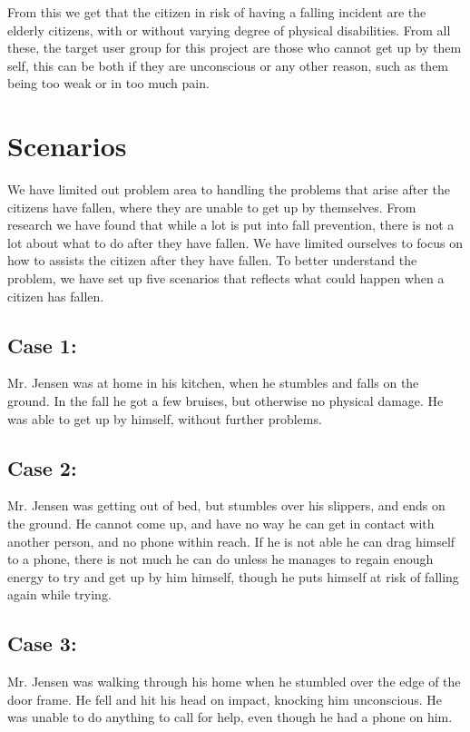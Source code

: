 From this we get that the citizen in risk of having a falling incident are the elderly citizens, with or without varying degree of physical disabilities. From all these, the target user group for this project are those who cannot get up by them self, this can be both if they are unconscious or any other reason, such as them being too weak or in too much pain.

\section{Scenarios} \label{preliminaries:problemanalysis:limitproblem}

We have limited out problem area to handling the problems that arise after the citizens have fallen, where they are unable to get up by themselves. From research we have found that while a lot is put into fall prevention, there is not a lot about what to do after they have fallen. We have limited ourselves to focus on how to assists the citizen after they have fallen. To better understand the problem, we have set up five scenarios that reflects what could happen when a citizen has fallen.

\subsection{Case 1:}
Mr. Jensen was at home in his kitchen, when he stumbles and falls on the ground. In the fall he got a few bruises, but otherwise no physical damage. He was able to get up by himself, without further problems.

\subsection{Case 2:}
Mr. Jensen was getting out of bed, but stumbles over his slippers, and ends on the ground. He cannot come up, and have no way he can get in contact with another person, and no phone within reach. If he is not able he can drag himself to a phone, there is not much he can do unless he manages to regain enough energy to try and get up by him himself, though he puts himself at risk of falling again while trying.

\subsection{Case 3:}
Mr. Jensen was walking through his home when he stumbled over the edge of the door frame. He fell and hit his head on impact, knocking him unconscious. He was unable to do anything to call for help, even though he had a phone on him.

